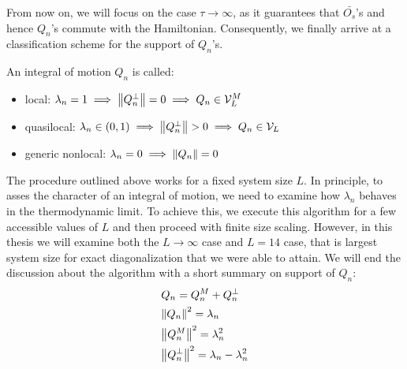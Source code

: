 From now on, we will focus on the case \(\tau \to \infty \), as it guarantees that \(\bar{O_s}\)'s and hence \(Q_n\)'s
commute with the Hamiltonian. 
Consequently, we finally arrive at a classification scheme for the support of \(Q_n\)'s.
\begin{definition}
  An integral of motion \(Q_n\) is called:
  \begin{itemize}
    \item local: \(\lambda_n = 1 \implies \norm{Q_n^{\perp}} = 0 \implies Q_n \in \mathcal{V}^M_L\)
    \item quasilocal: \(\lambda_n \in \left(0,1\right) \implies \norm{Q_n^{\perp}} > 0 \implies Q_n \in \mathcal{V}_L \)
    \item generic nonlocal: \(\lambda_n = 0 \implies \norm{Q_n} = 0\)
  \end{itemize}
\end{definition}
The procedure outlined above works for a fixed system size \(L\).
In principle, to asses the character of an integral of motion, we need to examine how \(\lambda_n\) behaves in the thermodynamic limit.
To achieve this, we execute this algorithm for a few accessible values of \(L\) and then proceed with finite size scaling.
However, in this thesis we will examine both the \(L\to \infty \) case and \(L = 14\)
case, that is largest system size for exact diagonalization that we were able to attain.
We will end the discussion about the algorithm with a short summary on support of \(Q_n\):
\begin{align}
  & Q_n = Q_n^M + Q_n^{\perp}\nonumber\\
  & \norm{Q_n}^2 = \lambda_n \nonumber\\
  & \norm{Q_n^M}^2 = \lambda_n^2 \nonumber\\
  & \norm{Q_n^{\perp}}^2 = \lambda_n - \lambda_n^2
  \label{eq:summary of support}
\end{align}

